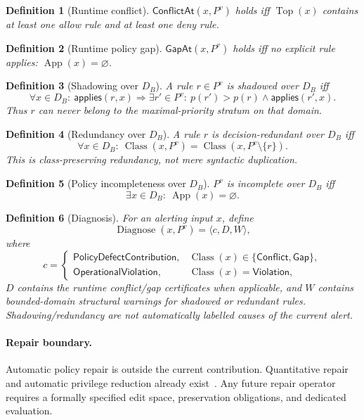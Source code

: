 \documentclass[11pt]{article}
\newtheorem{definition}{Definition}[section]
\theoremstyle{remark}
\newcommand{\Top}{\operatorname{Top}}
\newcommand{\App}{\operatorname{App}}
\newcommand{\Class}{\operatorname{Class}}
\newcommand{\Diagnose}{\operatorname{Diagnose}}
\newcommand{\Violation}{\mathsf{Violation}}
\newcommand{\Conflict}{\mathsf{Conflict}}
\newcommand{\Gap}{\mathsf{Gap}}
\begin{document}
\begin{definition}[Runtime conflict]
$\mathsf{ConflictAt}(x,P^v)$ holds iff $\Top(x)$ contains at least one allow rule and at least one deny rule.
\end{definition}

\begin{definition}[Runtime policy gap]
$\mathsf{GapAt}(x,P^v)$ holds iff no explicit rule applies: $\App(x)=\varnothing$.
\end{definition}

\begin{definition}[Shadowing over $D_B$]
A rule $r\in P^v$ is shadowed over $D_B$ iff
\[
\forall x\in D_B:\ \mathsf{applies}(r,x)\Rightarrow
\exists r'\in P^v:\ p(r')>p(r)\land\mathsf{applies}(r',x).
\]
Thus $r$ can never belong to the maximal-priority stratum on that domain.
\end{definition}

\begin{definition}[Redundancy over $D_B$]
A rule $r$ is decision-redundant over $D_B$ iff
\[
\forall x\in D_B:\ \Class(x,P^v)=\Class(x,P^v\setminus\{r\}).
\]
This is class-preserving redundancy, not mere syntactic duplication.
\end{definition}

\begin{definition}[Policy incompleteness over $D_B$]
$P^v$ is incomplete over $D_B$ iff
\[
\exists x\in D_B:\ \App(x)=\varnothing.
\]
\end{definition}

\begin{definition}[Diagnosis]
For an alerting input $x$, define
\[
\Diagnose(x,P^v)=\langle c,D,W\rangle,
\]
where
\[
c=
\begin{cases}
\mathsf{PolicyDefectContribution},&\Class(x)\in\{\Conflict,\Gap\},\\
\mathsf{OperationalViolation},&\Class(x)=\Violation,
\end{cases}
\]
$D$ contains the runtime conflict/gap certificates when applicable, and $W$ contains bounded-domain structural warnings for shadowed or redundant rules. Shadowing/redundancy are not automatically labelled causes of the current alert.
\end{definition}

\paragraph{Repair boundary.}
Automatic policy repair is outside the current contribution. Quantitative repair and automatic privilege reduction already exist~\citep{Eiers2023Repair,DAntoni2024Privilege}. Any future repair operator requires a formally specified edit space, preservation obligations, and dedicated evaluation.
\end{document}
